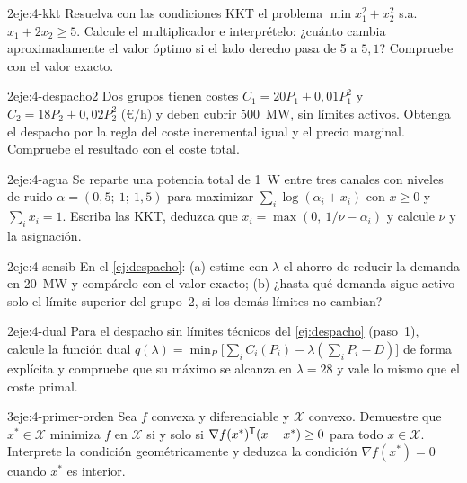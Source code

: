 \begin{ejercicio}{2}{eje:4-kkt}
Resuelva con las condiciones KKT el problema $\min x_1^{2}+x_2^{2}$ s.a. $x_1+2x_2\ge 5$. Calcule el multiplicador e interprételo: ¿cuánto cambia aproximadamente el valor óptimo si el lado derecho pasa de 5 a $5{,}1$? Compruebe con el valor exacto.
\end{ejercicio}

\begin{ejercicio}{2}{eje:4-despacho2}
Dos grupos tienen costes $C_1=20P_1+0{,}01P_1^{2}$ y $C_2=18P_2+0{,}02P_2^{2}$ (€/h) y deben cubrir 500~MW, sin límites activos. Obtenga el despacho por la regla del coste incremental igual y el precio marginal. Compruebe el resultado con el coste total.
\end{ejercicio}

\begin{ejercicio}{2}{eje:4-agua}
Se reparte una potencia total de 1~W entre tres canales con niveles de ruido $\alpha=(0{,}5;\ 1;\ 1{,}5)$ para maximizar $\sum_i\log(\alpha_i+x_i)$ con $x\ge 0$ y $\sum_ix_i=1$. Escriba las KKT, deduzca que $x_i=\max(0,\ 1/\nu-\alpha_i)$ y calcule $\nu$ y la asignación.
\end{ejercicio}

\begin{ejercicio}{2}{eje:4-sensib}
En el \cref{ej:despacho}: (a) estime con $\lambda$ el ahorro de reducir la demanda en 20~MW y compárelo con el valor exacto; (b) ¿hasta qué demanda sigue activo solo el límite superior del grupo~2, si los demás límites no cambian?
\end{ejercicio}

\begin{ejercicio}{2}{eje:4-dual}
Para el despacho sin límites técnicos del \cref{ej:despacho} (paso~1), calcule la función dual $q(\lambda)=\min_P\bigl[\sum_iC_i(P_i)-\lambda(\sum_iP_i-D)\bigr]$ de forma explícita y compruebe que su máximo se alcanza en $\lambda=28$ y vale lo mismo que el coste primal.
\end{ejercicio}

\begin{ejercicio}{3}{eje:4-primer-orden}
Sea $f$ convexa y diferenciable y $\mathcal{X}$ convexo. Demuestre que $x^{*}\in\mathcal{X}$ minimiza $f$ en $\mathcal{X}$ si y solo si $\nabla f(x^{*})^{\mathsf{T}}(x-x^{*})\ge 0$ para todo $x\in\mathcal{X}$. Interprete la condición geométricamente y deduzca la condición $\nabla f(x^{*})=0$ cuando $x^{*}$ es interior.
\end{ejercicio}
